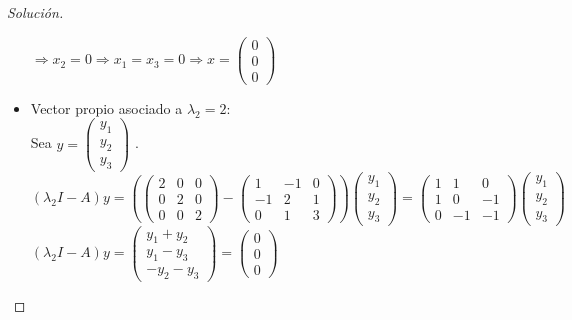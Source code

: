 \documentclass[12pt]{book}
\newenvironment{solucion}
  {\renewcommand\qedsymbol{$\square$}\begin{proof}[Solución]}
  {\end{proof}}
\begin{document}
\begin{solucion}
\begin{itemize}
        $\Rightarrow x_2=0\Rightarrow x_1=x_3=0\Rightarrow x= \begin{pmatrix}
        0\\
        0\\
        0
        \end{pmatrix}$\\ 
    \item Vector propio asociado a $\lambda_2=2$:\\
        Sea $y=\begin{pmatrix}
        y_1\\
        y_2\\
        y_3
        \end{pmatrix}$ .\\
        $(\lambda_2I-A)y=\left(\begin{pmatrix}
        2 & 0 & 0\\
        0 & 2 & 0\\
        0 & 0 & 2
        \end{pmatrix} - \begin{pmatrix}
        1 & -1 & 0\\
        -1 & 2 & 1\\
        0 & 1 & 3
        \end{pmatrix}\right) \begin{pmatrix}
        y_1\\
        y_2\\
        y_3
        \end{pmatrix}=\begin{pmatrix}
        1 & 1 & 0\\
        1 & 0 & -1\\
        0 & -1 & -1
        \end{pmatrix}\begin{pmatrix}
        y_1\\
        y_2\\
        y_3
        \end{pmatrix}$\\
        $(\lambda_2I-A)y=\begin{pmatrix}
        y_1+y_2\\
        y_1-y_3\\
        -y_2-y_3
        \end{pmatrix}=\begin{pmatrix}
        0\\
        0\\
        0
        \end{pmatrix}$\\

\end{itemize}
\end{solucion}
\end{document}
